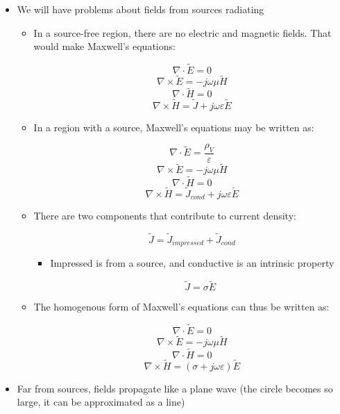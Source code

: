 \begin{itemize}

  \item We will have problems about fields from sources radiating

    \begin{itemize}

      \item In a source-free region, there are no electric and magnetic fields. That would make Maxwell's equations:

        $$\nabla\cdot\tilde{E}=0$$
        $$\nabla\times\tilde{E}=-j\omega\mu\tilde{H}$$
        $$\nabla\cdot\tilde{H}=0$$
        $$\nabla\times\tilde{H}=\tilde{J}+j\omega\varepsilon\tilde{E}$$

      \item In a region with a source, Maxwell's equations may be written as:

        $$\nabla\cdot\tilde{E}=\frac{\rho_V}{\varepsilon}$$
        $$\nabla\times\tilde{E}=-j\omega\mu\tilde{H}$$
        $$\nabla\cdot\tilde{H}=0$$
        $$\nabla\times\tilde{H}=\tilde{J}_{cond}+j\omega\varepsilon\tilde{E}$$

      \item There are two components that contribute to current density:

        $$\tilde{J}=\tilde{J}_{impressed}+\tilde{J}_{cond}$$

        \begin{itemize}

          \item Impressed is from a source, and conductive is an intrinsic property

            $$\tilde{J}=\sigma\tilde{E}$$

        \end{itemize}
        
      \item The homogenous form of Maxwell's equations can thus be written as:

        $$\nabla\cdot\tilde{E}=0$$
        $$\nabla\times\tilde{E}=-j\omega\mu\tilde{H}$$
        $$\nabla\cdot\tilde{H}=0$$
        $$\nabla\times\tilde{H}=(\sigma+j\omega\varepsilon)\tilde{E}$$

    \end{itemize}

  \item Far from sources, fields propagate like a plane wave (the circle becomes so large, it can be approximated as a line)


\end{itemize}
